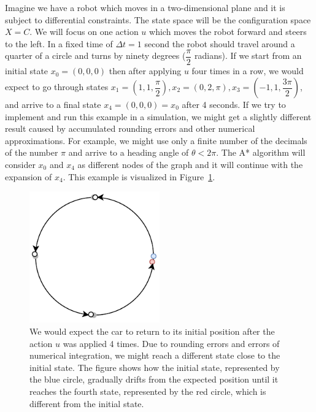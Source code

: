 \begin{example}
	Imagine we have a robot which moves in a two-dimensional plane and it is subject to differential constraints. The state space will be the configuration space $X=C$. We will focus on one action $u$ which moves the robot forward and steers to the left. In a fixed time of $\Delta t=1$ second the robot should travel around a quarter of a circle and turns by ninety degrees ($\dfrac{\pi}{2}$ radians). If we start from an initial state $x_0=\left(0,0,0\right)$ then after applying $u$ four times in a row, we would expect to go through states $x_1=\left(1,1,\dfrac{\pi}{2}\right),x_2=\left(0,2,\pi\right),x_3=\left(-1,1,\dfrac{3\pi}{2}\right)$, and arrive to a final state $x_4=\left(0,0,0\right)=x_0$ after 4 seconds. If we try to implement and run this example in a simulation, we might get a slightly different result caused by accumulated rounding errors and other numerical approximations. For example, we might use only a finite number of the decimals of the number $\pi$ and arrive to a heading angle of $\theta<2\pi$. The A* algorithm will consider $x_0$ and $x_4$ as different nodes of the graph and it will continue with the expansion of $x_4$. This example is visualized in Figure~\ref{fig:no_discretization_example}.
\end{example}

\begin{figure}
	\centering
	\includegraphics[width=0.5\textwidth]{../img/non_discretized_astar_state_duplication}
	\caption{We would expect the car to return to its initial position after the action $u$ was applied 4 times. Due to rounding errors and errors of numerical integration, we might reach a different state close to the initial state. The figure shows how the initial state, represented by the blue circle, gradually drifts from the expected position until it reaches the fourth state, represented by the red circle, which is different from the initial state.}
	\label{fig:no_discretization_example}
\end{figure}

